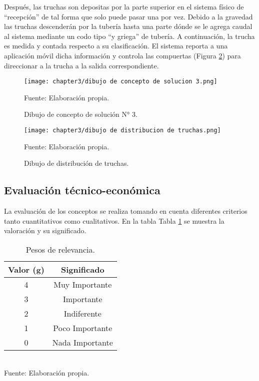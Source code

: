 Después, las truchas son depositas por la parte superior en el sistema físico de “recepción” de tal forma que solo puede pasar una por vez. Debido a la gravedad las truchas descenderán por la tubería hasta una parte dónde se le agrega caudal al sistema mediante un codo tipo “y griega” de tubería. A continuación, la trucha es medida y contada respecto a su clasificación. El sistema reporta a una aplicación móvil dicha información y controla las compuertas (Figura \ref{fig:dibujo de distribucion de truchas}) para direccionar a la trucha a la salida correspondiente.

\begin{figure}[H]
	\centering
	\texttt{[image: chapter3/dibujo de concepto de solucion 3.png]}
	\caption{Dibujo de concepto de solución N° 3.}
	Fuente: Elaboración propia.
	\label{fig:dibujo de concepto de solucion 3}
\end{figure}

\begin{figure}[H]
	\centering
	\texttt{[image: chapter3/dibujo de distribucion de truchas.png]}
	\caption{Dibujo de distribución de truchas.}
	Fuente: Elaboración propia.
	\label{fig:dibujo de distribucion de truchas}
\end{figure}

\subsection{Evaluación técnico-económica}

La evaluación de los conceptos se realiza tomando en cuenta diferentes criterios tanto cuantitativos como cualitativos. En la tabla Tabla \ref{tab:pesos de relevancia} se muestra la valoración y su significado.

\begin{table}[H]
	\centering
	\caption{Pesos de relevancia.}
	\label{tab:pesos de relevancia}
	\begin{tabular}{|c|c|}
		\hline
		\rowcolor[HTML]{D9D9D9} 
		\textbf{Valor (g)} & \textbf{Significado} \\ \hline
		4                  & Muy Importante       \\ \hline
		3                  & Importante           \\ \hline
		2                  & Indiferente          \\ \hline
		1                  & Poco Importante      \\ \hline
		0                  & Nada Importante      \\ \hline
	\end{tabular}
	\\Fuente: Elaboración propia.
\end{table}


